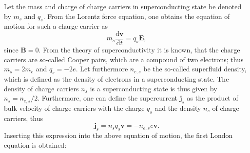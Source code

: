 \documentclass{report}
\numberwithin{tm}{section}
\newcommand\vect[1]{\ensuremath{\bm{#1}}}
\begin{document}
Let the mass and charge of charge carriers in superconducting state be denoted by $m_s$ and $q_s$. From the Lorentz force equation, one obtains the equation of motion for such a charge carrier as \begin{equation}
	m_s \frac{\mathrm{d}\vect{v}}{\mathrm{d}t} = q_s\vect{E},
\end{equation} since $\vect{B} = 0$. From the theory of superconductivity it is known, that the charge carriers are so-called Cooper pairs, which are a compound of two electrons; thus $m_s = 2m_e$ and $q_s = -2e$. Let furthermore $n_{e,s}$ be the so-called superfluid density, which is defined as the density of electrons in a superconducting state. The density of charge carriers $n_s$ is a superconducting state is thus given by $n_s = n_{e,s}/2$. Furthermore, one can define the supercurrent $\vect{j}_s$ as the product of bulk velocity of charge carriers with the charge $q_s$ and the density $n_s$ of charge carriers, thus \begin{equation}\label{eq:supercurrent_definition}
\vect{j}_s = n_sq_s\vect{v} = -n_{e,s}e\vect{v}.
\end{equation} Inserting this expression into the above equation of motion, the first London equation is obtained:
\end{document}
